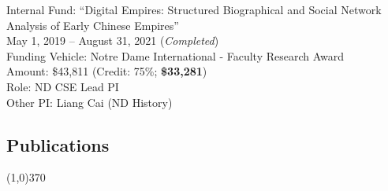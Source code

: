 \documentclass[10pt]{article}
\newenvironment{myindentpar}[1]%
{\begin{list}{}%
         {\setlength{\leftmargin}{#1}}%
         \item[]%
}
{\end{list}}
\newcounter{list}
\begin{document}
\begin{myindentpar}{0.75cm}
\hspace{-0.75cm}Internal Fund: ``Digital Empires: Structured Biographical and Social Network Analysis of Early Chinese Empires'' \\
May 1, 2019 -- August 31, 2021 (\emph{Completed}) \\
Funding Vehicle: Notre Dame International - Faculty Research Award \\
Amount: \$43,811 (Credit: 75\%; \textbf{\$33,281}) \\
Role: {ND CSE Lead PI} \\
Other PI: Liang Cai (ND History)

\end{myindentpar}

\subsection{}
\subsection{\sc Publications}
\vspace{-0.4cm} \line(1,0){370} \vspace{-0.1cm}
\end{document}
